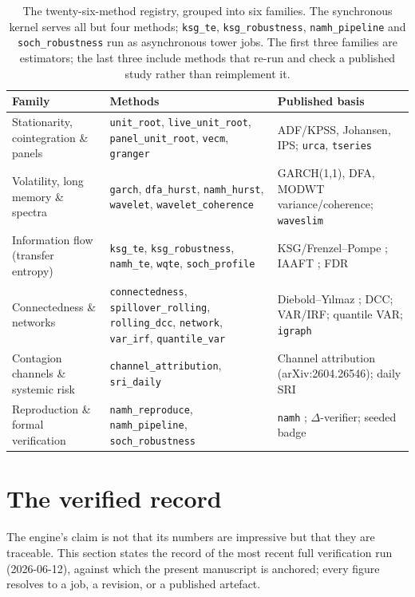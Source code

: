 \documentclass[11pt]{article}
\newcommand{\code}[1]{\texttt{\small #1}}
\begin{document}
\begin{table}[ht]
\centering
\small
\renewcommand{\arraystretch}{1.2}
\begin{tabular}{@{}>{\raggedright\arraybackslash}p{} >{\raggedright\arraybackslash}p{} >{\raggedright\arraybackslash}p{}@{}}
\toprule
\textbf{Family} & \textbf{Methods} & \textbf{Published basis} \\
\midrule
Stationarity, cointegration \& panels &
\code{unit\_root}, \code{live\_unit\_root}, \code{panel\_unit\_root}, \code{vecm}, \code{granger} &
ADF/KPSS, Johansen, IPS; \code{urca}, \code{tseries} \\
\addlinespace
Volatility, long memory \& spectra &
\code{garch}, \code{dfa\_hurst}, \code{namh\_hurst}, \code{wavelet}, \code{wavelet\_coherence} &
GARCH(1,1), DFA, MODWT variance/coherence; \code{waveslim} \\
\addlinespace
Information flow (transfer entropy) &
\code{ksg\_te}, \code{ksg\_robustness}, \code{namh\_te}, \code{wqte}, \code{soch\_profile} &
KSG/Frenzel--Pompe \cite{kraskov2004,frenzel2007,schreiber2000}; IAAFT \cite{schreiber1996}; FDR \cite{benjamini1995} \\
\addlinespace
Connectedness \& networks &
\code{connectedness}, \code{spillover\_rolling}, \code{rolling\_dcc}, \code{network}, \code{var\_irf}, \code{quantile\_var} &
Diebold--Y\i lmaz \cite{dieboldyilmaz2012}; DCC; VAR/IRF; quantile VAR; \code{igraph} \\
\addlinespace
Contagion channels \& systemic risk &
\code{channel\_attribution}, \code{sri\_daily} &
Channel attribution (arXiv:2604.26546); daily SRI \\
\addlinespace
Reproduction \& formal verification &
\code{namh\_reproduce}, \code{namh\_pipeline}, \code{soch\_robustness} &
\code{namh} \cite{namh2026}; $\Delta$-verifier; seeded badge \cite{lecuyer1999} \\
\bottomrule
\end{tabular}
\caption{The twenty-six-method registry, grouped into six families. The
synchronous kernel serves all but four methods; \code{ksg\_te},
\code{ksg\_robustness}, \code{namh\_pipeline} and \code{soch\_robustness} run as
asynchronous tower jobs. The first three families are estimators; the last three
include methods that re-run and check a published study rather than reimplement
it.}
\label{tab:registry}
\end{table}

\section{The verified record}
\label{sec:record}
The engine's claim is not that its numbers are impressive but that they are
traceable. This section states the record of the most recent full verification
run (2026-06-12), against which the present manuscript is anchored; every figure
resolves to a job, a revision, or a published artefact.
\end{document}
